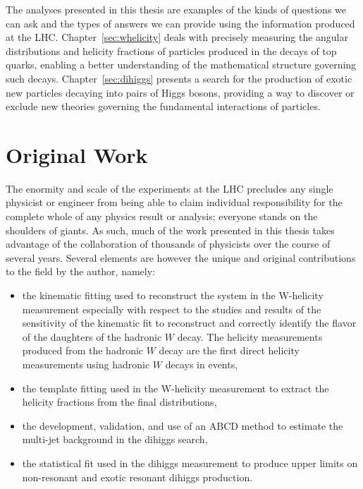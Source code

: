The analyses presented in this thesis are examples of the kinds of questions we can ask and the types of answers we can provide using the information produced at the LHC. Chapter~\ref{sec:whelicity} deals with precisely measuring the angular distributions and helicity fractions of particles produced in the decays of top quarks, enabling a better understanding of the mathematical structure governing such decays. Chapter~\ref{sec:dihiggs} presents a search for the production of exotic new particles decaying into pairs of Higgs bosons, providing a way to discover or exclude new theories governing the fundamental interactions of particles. 

\section{Original Work}
The enormity and scale of the experiments at the LHC precludes any single physicist or engineer from being able to claim individual responsibility for the complete whole of any physics result or analysis; everyone stands on the shoulders of giants. As such, much of the work presented in this thesis takes advantage of the collaboration of thousands of physicists over the course of several years. Several elements are however the unique and original contributions to the field by the author, namely:
\begin{itemize}
\item the kinematic fitting used to reconstruct the \ttbar system in the W-helicity measurement especially with respect to the studies and results of the sensitivity of the kinematic fit to reconstruct and correctly identify the flavor of the daughters of the hadronic $W$ decay. The helicity measurements produced from the hadronic $W$ decay are the first direct helicity measurements using hadronic $W$ decays in \ttbar events,
\item the template fitting used in the W-helicity measurement to extract the helicity fractions from the final distributions, 
\item the development, validation, and use of an ABCD method to estimate the multi-jet background in the dihiggs search,
\item the statistical fit used in the dihiggs measurement to produce upper limits on non-resonant and exotic resonant dihiggs production.
\end{itemize}